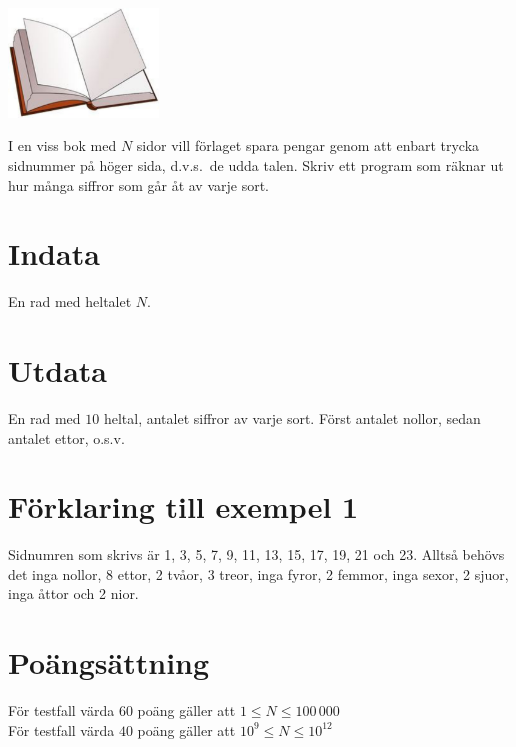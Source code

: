 
\begin{center}
\includegraphics[width=0.3\textwidth]{bokbild.pdf}
\end{center}
 
I en viss bok med $N$ sidor vill förlaget spara pengar genom att enbart trycka
sidnummer på höger sida, d.v.s.\ de udda talen. Skriv ett program som
räknar ut hur många siffror som går åt av varje sort.

\section*{Indata}
En rad med heltalet $N$.

\section*{Utdata}
En rad med $10$ heltal, antalet siffror av varje sort. Först antalet nollor, sedan antalet ettor, o.s.v.

\section*{Förklaring till exempel 1}

Sidnumren som skrivs är 1, 3, 5, 7, 9, 11, 13, 15,
17, 19, 21 och 23. Alltså behövs det inga nollor, 8 ettor, 2 tvåor, 3
treor, inga fyror, 2 femmor, inga sexor, 2 sjuor, inga åttor och 2 nior.

\section*{Poängsättning}
För testfall värda $60$ poäng gäller att $1 \le N \le 100\,000$ \\
För testfall värda $40$ poäng gäller att $10^{9} \le N \le 10^{12}$ \\
